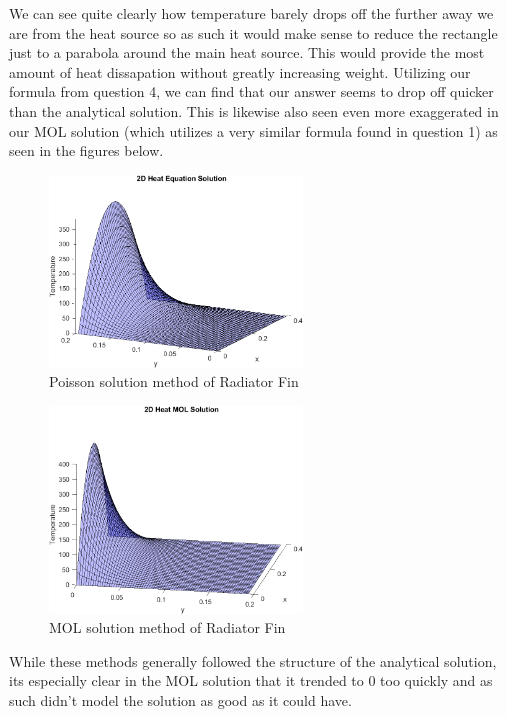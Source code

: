 \documentclass{article}
\begin{document}
We can see quite clearly how temperature barely drops off the further away we are from the heat source so as such it would make sense to reduce the rectangle just to a parabola around the main heat source. This would provide the most amount of heat dissapation without greatly increasing weight.
Utilizing our formula from question 4, we can find that our answer seems to drop off quicker than the analytical solution. This is likewise also seen even more exaggerated in our MOL solution (which utilizes a very similar formula found in question 1) as seen in the figures below.
\begin{figure}[H]
    \centering 
    \includegraphics[width=0.6\textwidth]{FinPoisson.png}
    \caption{Poisson solution method of Radiator Fin}
\end{figure}
\begin{figure}[H]
    \centering
    \includegraphics[width=0.6\textwidth]{FinMOL.png}
    \caption{MOL solution method of Radiator Fin}
\end{figure}

While these methods generally followed the structure of the analytical solution, its especially clear in the MOL solution that it trended to 0 too quickly and as such didn't model the solution as good as it could have.







\end{document}
